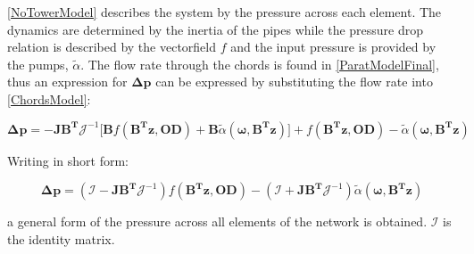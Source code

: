 \eqref{NoTowerModel} describes the system by the pressure across each element. The dynamics are determined by the inertia of the pipes while the pressure drop relation is described by the vectorfield $f$ and the input pressure is provided by the pumps, $\tilde\alpha$. 
The flow rate through the chords is found in \eqref{ParatModelFinal}, thus an expression for $ \bm{\Delta p} $ can be expressed by substituting the flow rate into \eqref{ChordsModel}: 

\begin{equation}
 \bm{\Delta p} =  -\bm{J} \bm{B^T}\bm{\mathcal{J}}^{-1} \Big[ \bm{B} f(\bm{B^T}\bm{z}, \bm{OD}) + \bm{B}\tilde{\alpha} (\bm{\omega},\bm{B^T}\bm{z}) \Big ] + f(\bm{B^T}\bm{z},\bm{OD}) - \tilde{\alpha} (\bm{\omega},\bm{B^T}\bm{z})
  \label{PressureLarge}
 \end{equation}
 
Writing in short form:
 
 \begin{equation}
  \bm{\Delta p} = (\bm{\mathcal{I}} - \bm{J} \bm{B^T}\bm{\mathcal{J}}^{-1} ) f(\bm{B^T}\bm{z}, \bm{OD}) - (\bm{\mathcal{I}} + \bm{J} \bm{B^T}\bm{\mathcal{J}}^{-1} ) \tilde{\alpha} (\bm{\omega},\bm{B^T}\bm{z})
  \label{PressureShort}
 \end{equation}

a general form of the pressure across all elements of the network is obtained. $\bm{\mathcal{I}}$ is the identity matrix. 


